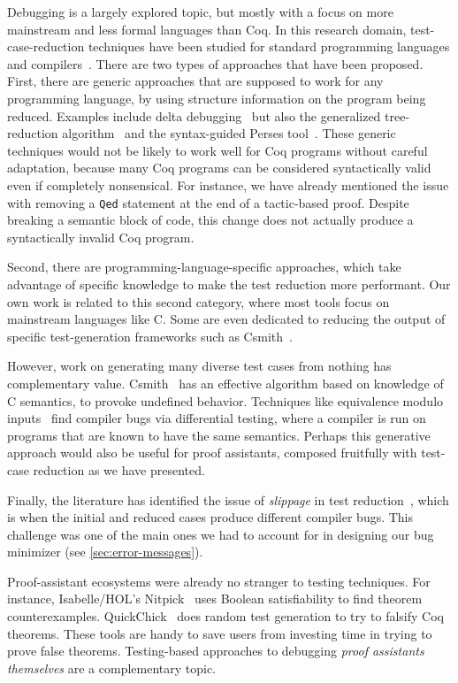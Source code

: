\documentclass[a4paper,USenglish,cleveref,autoref,thm-restate]{lipics-v2021}
\begin{document}
Debugging is a largely explored topic, but mostly with a focus on more mainstream and less formal languages than Coq.
In this research domain, test-case-reduction techniques have been studied for standard programming languages and compilers~\cite{chen_survey_compiler_testing}. There are two types of approaches that have been proposed. First, there are generic approaches that are supposed to work for any programming language, by using structure information on the program being reduced. Examples include delta debugging~\cite{Zeller2002} but also the generalized tree-reduction algorithm~\cite{herfert2017automatically} and the syntax-guided Perses tool~\cite{herfert2017automatically}. These generic techniques would not be likely to work well for Coq programs without careful adaptation, because many Coq programs can be considered syntactically valid even if completely nonsensical. For instance, we have already mentioned the issue with removing a \texttt{Qed} statement at the end of a tactic-based proof. Despite breaking a semantic block of code, this change does not actually produce a syntactically invalid Coq program.

Second, there are programming-language-specific approaches, which take advantage of specific knowledge to make the test reduction more performant. Our own work is related to this second category, where most tools focus on mainstream languages like C. Some are even dedicated to reducing the output of specific test-generation frameworks such as Csmith~\cite{regehr2012test}.

However, work on generating many diverse test cases from nothing has complementary value.
Csmith~\cite{yang2011finding} has an effective algorithm based on knowledge of C semantics, to provoke undefined behavior.
Techniques like equivalence modulo inputs~\cite{emi} find compiler bugs via differential testing, where a compiler is run on programs that are known to have the same semantics.
Perhaps this generative approach would also be useful for proof assistants, composed fruitfully with test-case reduction as we have presented.

Finally, the literature has identified the issue of \emph{slippage} in test reduction~\cite{chen2013taming,holmes2016mitigating}, which is when the initial and reduced cases produce different compiler bugs. This challenge was one of the main ones we had to account for in designing our bug minimizer (see \autoref{sec:error-messages}).

Proof-assistant ecosystems were already no stranger to testing techniques.
For instance, Isabelle/HOL's Nitpick~\cite{Nitpick} uses Boolean satisfiability to find theorem counterexamples.
QuickChick~\cite{quickchick} does random test generation to try to falsify Coq theorems.
These tools are handy to save users from investing time in trying to prove false theorems.
Testing-based approaches to debugging \emph{proof assistants themselves} are a complementary topic.
\end{document}

